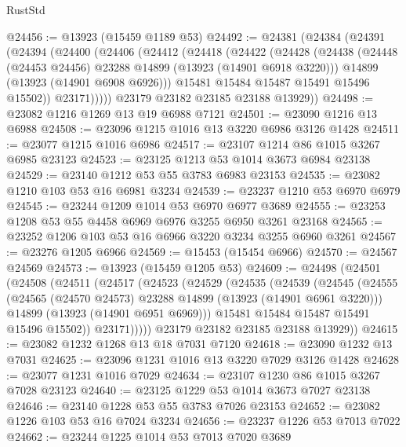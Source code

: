 \begin{lexlean}{RustStd}
\begin{coremodule}
@24456 := @13923 (@15459 @1189 @53)
@24492 := @24381
    (@24384
      (@24391
        (@24394
          (@24400
            (@24406
              (@24412
                (@24418
                  (@24422
                    (@24428
                      (@24438
                        (@24448 (@24453 @24456) @23288 @14899 (@13923 (@14901 @6918 @3220)))
                        @14899
                        (@13923 (@14901 @6908 @6926)))
                      @15481
                      @15484
                      @15487
                      @15491
                      @15496
                      @15502))
                  @23171)))))
        @23179
        @23182
        @23185
        @23188
        @13929))
@24498 := @23082 @1216 @1269 @13 @19 @6988 @7121
@24501 := @23090 @1216 @13 @6988
@24508 := @23096 @1215 @1016 @13 @3220 @6986 @3126 @1428
@24511 := @23077 @1215 @1016 @6986
@24517 := @23107 @1214 @86 @1015 @3267 @6985 @23123
@24523 := @23125 @1213 @53 @1014 @3673 @6984 @23138
@24529 := @23140 @1212 @53 @55 @3783 @6983 @23153
@24535 := @23082 @1210 @103 @53 @16 @6981 @3234
@24539 := @23237 @1210 @53 @6970 @6979
@24545 := @23244 @1209 @1014 @53 @6970 @6977 @3689
@24555 := @23253 @1208 @53 @55 @4458 @6969 @6976 @3255 @6950 @3261 @23168
@24565 := @23252 @1206 @103 @53 @16 @6966 @3220 @3234 @3255 @6960 @3261
@24567 := @23276 @1205 @6966
@24569 := @15453 (@15454 @6966)
@24570 := @24567 @24569
@24573 := @13923 (@15459 @1205 @53)
@24609 := @24498
    (@24501
      (@24508
        (@24511
          (@24517
            (@24523
              (@24529
                (@24535
                  (@24539
                    (@24545
                      (@24555
                        (@24565 (@24570 @24573) @23288 @14899 (@13923 (@14901 @6961 @3220)))
                        @14899
                        (@13923 (@14901 @6951 @6969)))
                      @15481
                      @15484
                      @15487
                      @15491
                      @15496
                      @15502))
                  @23171)))))
        @23179
        @23182
        @23185
        @23188
        @13929))
@24615 := @23082 @1232 @1268 @13 @18 @7031 @7120
@24618 := @23090 @1232 @13 @7031
@24625 := @23096 @1231 @1016 @13 @3220 @7029 @3126 @1428
@24628 := @23077 @1231 @1016 @7029
@24634 := @23107 @1230 @86 @1015 @3267 @7028 @23123
@24640 := @23125 @1229 @53 @1014 @3673 @7027 @23138
@24646 := @23140 @1228 @53 @55 @3783 @7026 @23153
@24652 := @23082 @1226 @103 @53 @16 @7024 @3234
@24656 := @23237 @1226 @53 @7013 @7022
@24662 := @23244 @1225 @1014 @53 @7013 @7020 @3689

\end{coremodule}
\end{lexlean}
